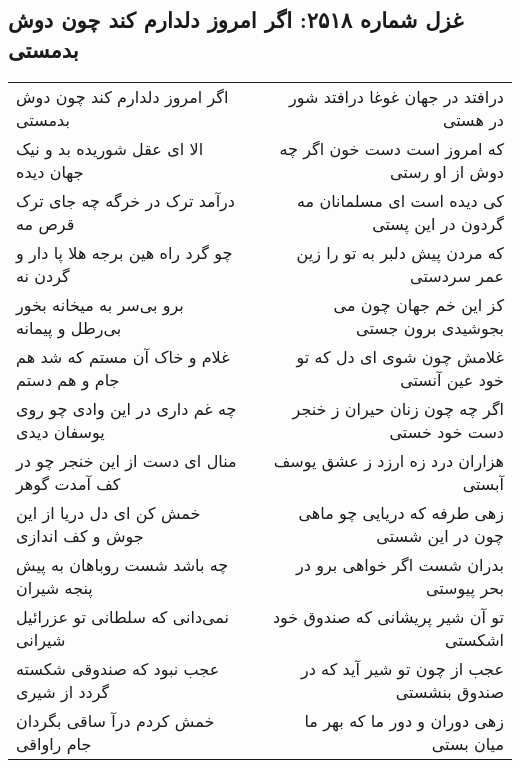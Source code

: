 \begin{center}
\section*{غزل شماره ۲۵۱۸: اگر امروز دلدارم کند چون دوش بدمستی}
\label{sec:2518}
\begin{longtable}{l p{0.5cm} r}
اگر امروز دلدارم کند چون دوش بدمستی
&&
درافتد در جهان غوغا درافتد شور در هستی
\\
الا ای عقل شوریده بد و نیک جهان دیده
&&
که امروز است دست خون اگر چه دوش از او رستی
\\
درآمد ترک در خرگه چه جای ترک قرص مه
&&
کی دیده است ای مسلمانان مه گردون در این پستی
\\
چو گرد راه هین برجه هلا پا دار و گردن نه
&&
که مردن پیش دلبر به تو را زین عمر سردستی
\\
برو بی‌سر به میخانه بخور بی‌رطل و پیمانه
&&
کز این خم جهان چون می بجوشیدی برون جستی
\\
غلام و خاک آن مستم که شد هم جام و هم دستم
&&
غلامش چون شوی ای دل که تو خود عین آنستی
\\
چه غم داری در این وادی چو روی یوسفان دیدی
&&
اگر چه چون زنان حیران ز خنجر دست خود خستی
\\
منال ای دست از این خنجر چو در کف آمدت گوهر
&&
هزاران درد زه ارزد ز عشق یوسف آبستی
\\
خمش کن ای دل دریا از این جوش و کف اندازی
&&
زهی طرفه که دریایی چو ماهی چون در این شستی
\\
چه باشد شست روباهان به پیش پنجه شیران
&&
بدران شست اگر خواهی برو در بحر پیوستی
\\
نمی‌دانی که سلطانی تو عزرائیل شیرانی
&&
تو آن شیر پریشانی که صندوق خود اشکستی
\\
عجب نبود که صندوقی شکسته گردد از شیری
&&
عجب از چون تو شیر آید که در صندوق بنشستی
\\
خمش کردم درآ ساقی بگردان جام راواقی
&&
زهی دوران و دور ما که بهر ما میان بستی
\\
\end{longtable}
\end{center}
